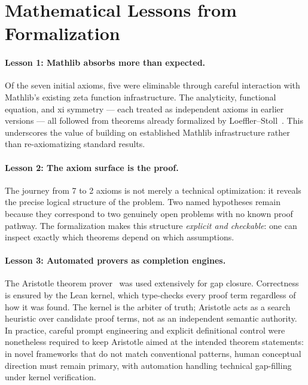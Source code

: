 \documentclass[12pt, a4paper]{article}
\theoremstyle{plain}
\theoremstyle{definition}
\newcommand{\Aristotle}{\textsf{Aristotle}}
\begin{document}
\section{Mathematical Lessons from Formalization}
\label{sec:lessons}

\paragraph{Lesson 1: Mathlib absorbs more than expected.}
Of the seven initial axioms, five were eliminable through careful
interaction with Mathlib's existing zeta function infrastructure.
The analyticity, functional equation, and xi symmetry --- each treated as
independent axioms in earlier versions --- all followed from theorems
already formalized by Loeffler--Stoll~\cite{loeffler2025}.
This underscores the value of building on established Mathlib infrastructure
rather than re-axiomatizing standard results.

\paragraph{Lesson 2: The axiom surface is the proof.}
The journey from 7 to 2 axioms is not merely a technical optimization:
it reveals the precise logical structure of the problem.
Two named hypotheses remain because they correspond to two genuinely
open problems with no known proof pathway.
The formalization makes this structure \emph{explicit and checkable}:
one can inspect exactly which theorems depend on which assumptions.

\paragraph{Lesson 3: Automated provers as completion engines.}
The \Aristotle{} theorem prover~\cite{aristotle2025} was used extensively
for gap closure.
Correctness is ensured by the Lean kernel, which type-checks every
proof term regardless of how it was found.
The kernel is the arbiter of truth; \Aristotle{} acts as a search
heuristic over candidate proof terms, not as an independent semantic
authority.
In practice, careful prompt engineering and explicit definitional
control were nonetheless required to keep \Aristotle{} aimed at the
intended theorem statements: in novel frameworks that do not match
conventional patterns, human conceptual direction must remain primary,
with automation handling technical gap-filling under kernel
verification.
\end{document}
